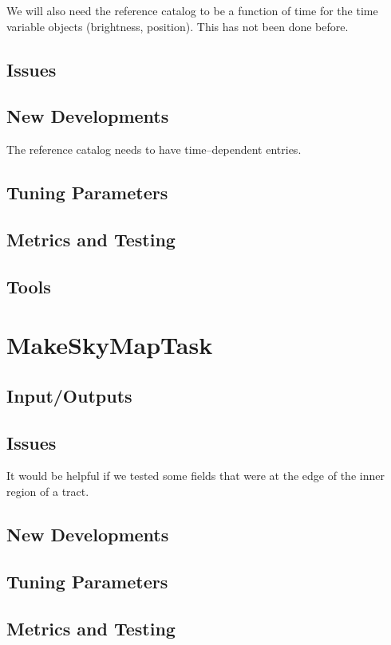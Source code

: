 \documentclass[12pt]{article}
\begin{document}
We will also need the reference catalog to be a function of time for
the time variable objects (brightness, position).  This has not been
done before.

\subsection{Issues}

\subsection{New Developments}
The reference catalog needs to have time--dependent entries.

\subsection{Tuning Parameters}

\subsection{Metrics and Testing}

\subsection{Tools}


\clearpage 
\section{MakeSkyMapTask} 

\subsection{Input/Outputs}
\subsection{Issues}
It would be helpful if we tested some fields that were at the edge of
the inner region of a tract.
\subsection{New Developments}
\subsection{Tuning Parameters}

\subsection{Metrics and Testing}
\end{document}
